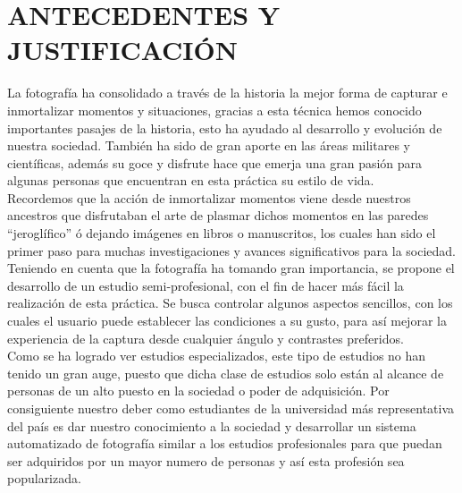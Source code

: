 \documentclass[10pt,graphicx,caption,rotating]{article}
\begin{document}
\section{ANTECEDENTES Y JUSTIFICACIÓN}
\noindent
La fotografía ha consolidado a través de la historia la mejor forma de capturar e inmortalizar momentos y situaciones, gracias a esta técnica hemos conocido importantes pasajes de la historia, esto ha ayudado al desarrollo y evolución de nuestra sociedad. También ha sido de gran aporte en las áreas militares y científicas, además su goce y disfrute hace que emerja una gran pasión para algunas personas que encuentran en esta práctica su estilo de vida.\\
Recordemos que la acción de inmortalizar momentos viene desde nuestros ancestros que disfrutaban el arte de plasmar dichos momentos en las paredes ``jeroglífico'' ó dejando imágenes en libros o manuscritos, los cuales han sido el primer paso para muchas investigaciones y avances significativos para la sociedad.\\
Teniendo en cuenta que la fotografía ha tomando gran importancia, se propone el desarrollo de un estudio semi-profesional, con el fin de hacer más fácil la realización de esta práctica. Se busca controlar algunos aspectos sencillos, con los cuales el usuario puede establecer las condiciones a su gusto, para así mejorar la experiencia de la captura desde cualquier ángulo y contrastes preferidos.\\
Como se ha logrado ver estudios especializados, este tipo de estudios no han tenido un gran auge, puesto que dicha clase de estudios solo están al alcance de personas de un alto puesto en la sociedad o poder de adquisición. Por consiguiente nuestro deber como estudiantes de la universidad más representativa del país es dar nuestro conocimiento a la sociedad y desarrollar un sistema automatizado de fotografía similar a los estudios profesionales para que puedan ser adquiridos por un mayor numero de personas y así esta profesión sea popularizada.
\end{document}
